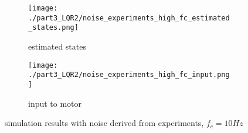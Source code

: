 \begin{figure}[H]
	\centering
	\begin{subfigure}[b]{0.45\textwidth}
		\texttt{[image: ./part3\_LQR2/noise\_experiments\_high\_fc\_estimated\_states.png]}
		\caption{estimated states}
	\end{subfigure}
	\begin{subfigure}[b]{0.45\textwidth}
		\texttt{[image: ./part3\_LQR2/noise\_experiments\_high\_fc\_input.png]}
		\caption{input to motor}
	\end{subfigure}
	\caption{simulation results with noise derived from experiments, $f_c=10Hz$}
	\label{fig:LQR2 simulation with real noise high noise}
\end{figure}
